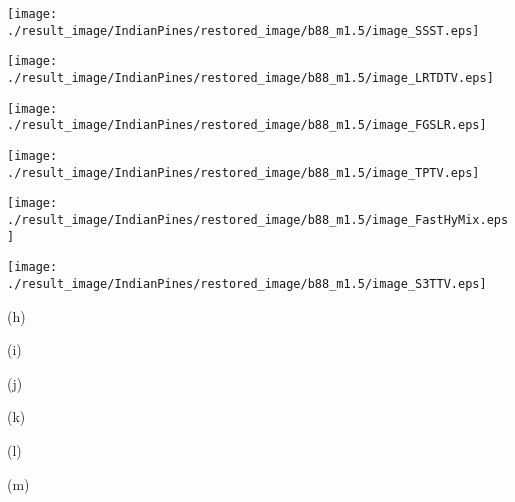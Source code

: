 \begin{figure*}[t]
\begin{center}
        \vspace{2mm}

        \begin{minipage}{0.150\hsize}
            \centerline{\texttt{[image: ./result\_image/IndianPines/restored\_image/b88\_m1.5/image\_SSST.eps]}} %
        \end{minipage}
        \begin{minipage}{0.150\hsize}
            \centerline{\texttt{[image: ./result\_image/IndianPines/restored\_image/b88\_m1.5/image\_LRTDTV.eps]}} %
        \end{minipage}
        \begin{minipage}{0.150\hsize}
        	\centerline{\texttt{[image: ./result\_image/IndianPines/restored\_image/b88\_m1.5/image\_FGSLR.eps]}} %
        \end{minipage}
        \begin{minipage}{0.150\hsize}
            \centerline{\texttt{[image: ./result\_image/IndianPines/restored\_image/b88\_m1.5/image\_TPTV.eps]}} %
        \end{minipage}
        \begin{minipage}{0.150\hsize}
        	\centerline{\texttt{[image: ./result\_image/IndianPines/restored\_image/b88\_m1.5/image\_FastHyMix.eps]}} %
        \end{minipage}
        \begin{minipage}{0.150\hsize}
            \centerline{\texttt{[image: ./result\_image/IndianPines/restored\_image/b88\_m1.5/image\_S3TTV.eps]}} %
        \end{minipage}
        
        \vspace{1mm}


		\begin{minipage}{0.150\hsize}
			\centerline{\small{(h)}}
		\end{minipage}
		\begin{minipage}{0.150\hsize}
			\centerline{\small{(i)}}
		\end{minipage}
		\begin{minipage}{0.150\hsize}
			\centerline{\small{(j)}}
		\end{minipage}
		\begin{minipage}{0.150\hsize}
			\centerline{\small{(k)}}
		\end{minipage}
		\begin{minipage}{0.150\hsize}
			\centerline{\small{(l)}}
		\end{minipage}
		\begin{minipage}{0.150\hsize}
			\centerline{\small{(m)}}
		\end{minipage}
    \end{center}
	

\end{figure*}
